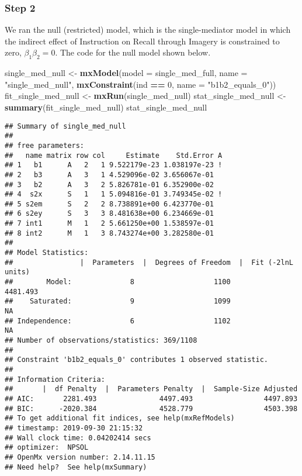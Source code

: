 \documentclass[11pt,]{article}
\newenvironment{Shaded}{\begin{snugshade}}{\end{snugshade}}
\newcommand{\DataTypeTok}[1]{\textcolor[rgb]{0.13,0.29,0.53}{#1}}
\newcommand{\DecValTok}[1]{\textcolor[rgb]{0.00,0.00,0.81}{#1}}
\newcommand{\KeywordTok}[1]{\textcolor[rgb]{0.13,0.29,0.53}{\textbf{#1}}}
\newcommand{\NormalTok}[1]{#1}
\newcommand{\OperatorTok}[1]{\textcolor[rgb]{0.81,0.36,0.00}{\textbf{#1}}}
\newcommand{\StringTok}[1]{\textcolor[rgb]{0.31,0.60,0.02}{#1}}
\begin{document}
\hypertarget{step-2}{%
\subsubsection{Step 2}\label{step-2}}

We ran the null (restricted) model, which is the single-mediator model
in which the indirect effect of Instruction on Recall through Imagery is
constrained to zero, \(\beta_1 \beta_2 =0\). The code for the null model
shown below.

\begin{Shaded}
\begin{Highlighting}[]
\NormalTok{single_med_null <-}
\StringTok{  }\KeywordTok{mxModel}\NormalTok{(}\DataTypeTok{model =}\NormalTok{ single_med_full,}
          \DataTypeTok{name =} \StringTok{"single_med_null"}\NormalTok{,}
          \KeywordTok{mxConstraint}\NormalTok{(ind }\OperatorTok{==}\StringTok{ }\DecValTok{0}\NormalTok{, }\DataTypeTok{name =} \StringTok{"b1b2_equals_0"}\NormalTok{))}
\NormalTok{fit_single_med_null <-}\StringTok{ }\KeywordTok{mxRun}\NormalTok{(single_med_null)}
\NormalTok{stat_single_med_null <-}\StringTok{ }\KeywordTok{summary}\NormalTok{(fit_single_med_null)}
\NormalTok{stat_single_med_null}
\end{Highlighting}
\end{Shaded}

\begin{verbatim}
## Summary of single_med_null 
##  
## free parameters:
##   name matrix row col     Estimate    Std.Error A
## 1   b1      A   2   1 9.522179e-23 1.038197e-23 !
## 2   b3      A   3   1 4.529096e-02 3.656067e-01  
## 3   b2      A   3   2 5.826781e-01 6.352900e-02  
## 4  s2x      S   1   1 5.094816e-01 3.749345e-02 !
## 5 s2em      S   2   2 8.738891e+00 6.423770e-01  
## 6 s2ey      S   3   3 8.481638e+00 6.234669e-01  
## 7 int1      M   1   2 5.661250e+00 1.538597e-01  
## 8 int2      M   1   3 8.743274e+00 3.282580e-01  
## 
## Model Statistics: 
##                |  Parameters  |  Degrees of Freedom  |  Fit (-2lnL units)
##        Model:              8                   1100              4481.493
##    Saturated:              9                   1099                    NA
## Independence:              6                   1102                    NA
## Number of observations/statistics: 369/1108
## 
## Constraint 'b1b2_equals_0' contributes 1 observed statistic. 
## 
## Information Criteria: 
##       |  df Penalty  |  Parameters Penalty  |  Sample-Size Adjusted
## AIC:       2281.493               4497.493                 4497.893
## BIC:      -2020.384               4528.779                 4503.398
## To get additional fit indices, see help(mxRefModels)
## timestamp: 2019-09-30 21:15:32 
## Wall clock time: 0.04202414 secs 
## optimizer:  NPSOL 
## OpenMx version number: 2.14.11.15 
## Need help?  See help(mxSummary)
\end{verbatim}
\end{document}
